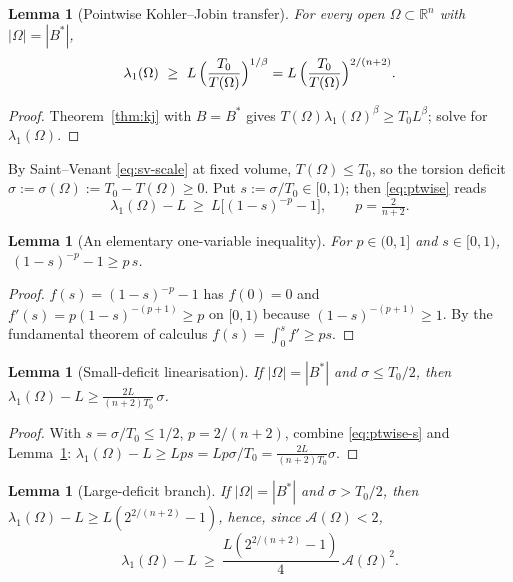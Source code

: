 \documentclass[11pt]{amsart}
\newtheorem{lemma}[theorem]{Lemma}
\theoremstyle{definition}
\newcommand{\R}{\mathbb R}
\newcommand{\Om}{\Omega}
\newcommand{\Fr}{\mathcal A}
\newcommand{\abs}[1]{\left|#1\right|}
\begin{document}
\begin{lemma}[Pointwise Kohler--Jobin transfer]\label{lem:ptwise}
For every open $\Om\subset\R^n$ with $\abs\Om=\abs{B^*}$,
\begin{equation}\label{eq:ptwise}
  \lambda_1(\Om)\ \ge\ L\,\Bigl(\frac{T_0}{T(\Om)}\Bigr)^{1/\beta}
  =L\,\Bigl(\frac{T_0}{T(\Om)}\Bigr)^{2/(n+2)} .
\end{equation}
\end{lemma}

\begin{proof}
Theorem~\ref{thm:kj} with $B=B^*$ gives
$T(\Om)\lambda_1(\Om)^\beta\ge T_0 L^\beta$; solve for $\lambda_1(\Om)$.
\end{proof}

By Saint--Venant \eqref{eq:sv-scale} at fixed volume, $T(\Om)\le T_0$, so
the torsion deficit $\sigma:=\sigma(\Om):=T_0-T(\Om)\ge0$. Put
$s:=\sigma/T_0\in[0,1)$; then \eqref{eq:ptwise} reads
\begin{equation}\label{eq:ptwise-s}
  \lambda_1(\Om)-L\ \ge\ L\bigl[(1-s)^{-p}-1\bigr],\qquad p=\tfrac{2}{n+2}.
\end{equation}

\begin{lemma}[An elementary one-variable inequality]\label{lem:onevar}
For $p\in(0,1]$ and $s\in[0,1)$, $\ (1-s)^{-p}-1\ge p\,s$.
\end{lemma}

\begin{proof}
$f(s)=(1-s)^{-p}-1$ has $f(0)=0$ and $f'(s)=p(1-s)^{-(p+1)}\ge p$ on
$[0,1)$ because $(1-s)^{-(p+1)}\ge1$. By the fundamental theorem of
calculus $f(s)=\int_0^s f'\ge ps$.
\end{proof}

\begin{lemma}[Small-deficit linearisation]\label{lem:small}
If $\abs\Om=\abs{B^*}$ and $\sigma\le T_0/2$, then
$\displaystyle\lambda_1(\Om)-L\ge\frac{2L}{(n+2)T_0}\,\sigma$.
\end{lemma}

\begin{proof}
With $s=\sigma/T_0\le1/2$, $p=2/(n+2)$, combine \eqref{eq:ptwise-s} and
Lemma~\ref{lem:onevar}:
$\lambda_1(\Om)-L\ge Lps=Lp\sigma/T_0=\tfrac{2L}{(n+2)T_0}\sigma$.
\end{proof}

\begin{lemma}[Large-deficit branch]\label{lem:large}
If $\abs\Om=\abs{B^*}$ and $\sigma>T_0/2$, then
$\lambda_1(\Om)-L\ge L(2^{2/(n+2)}-1)$, hence, since $\Fr(\Om)<2$,
\begin{equation}\label{eq:large}
  \lambda_1(\Om)-L\ \ge\ \frac{L(2^{2/(n+2)}-1)}{4}\,\Fr(\Om)^2 .
\end{equation}
\end{lemma}
\end{document}
